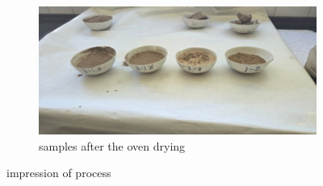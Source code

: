 \begin{figure}[H]
    \vspace{0.5cm}

    \begin{subfigure}[H]{0.75\textwidth}
        \includegraphics[width=12cm,]{figures/appendix-f/samplesafterheat.png}
        \caption{samples after the oven drying}
        \label{fig:sato}
    \end{subfigure}
    \caption{impression of process}
    \label{fig:all_three}
\end{figure}


